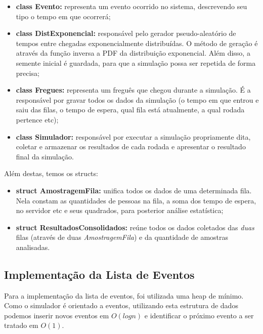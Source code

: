 \documentclass[a4paper,10pt]{article}
\begin{document}
\begin {itemize}
\item \textbf{class Evento:} representa um evento ocorrido no sistema, descrevendo seu tipo o tempo em que ocorrerá;

\item \textbf{class DistExponencial:} responsável pelo gerador pseudo-aleatório de tempos entre chegadas exponencialmente distribuídas. O método de geração é através da função inversa a PDF da distribuição exponencial. Além disso, a semente inicial é guardada, para que a simulação possa ser repetida de forma precisa;

\item \textbf{class Fregues:} representa um freguês que chegou durante a simulação. É a responsável por gravar todos os dados da simulação (o tempo em que entrou e saiu das filas, o tempo de espera, qual fila está atualmente, a qual rodada pertence etc);

\item \textbf{class Simulador:} responsável por executar a simulação propriamente dita, coletar e armazenar os resultados de cada rodada e apresentar o resultado final da simulação.
\end {itemize}

    Além destas, temos os structs:

\begin {itemize}
\item \textbf{struct AmostragemFila:} unifica todos os dados de uma determinada fila. Nela constam as quantidades de pessoas na fila, a soma dos tempo de espera, no servidor etc e seus quadrados, para posterior análise estatística;

\item \textbf{struct ResultadosConsolidados:} reúne todos os dados coletados das \emph{duas} filas (através de duas \emph{AmostragemFila}) e da quantidade de amostras analisadas.
\end {itemize}


\subsection{Implementação da Lista de Eventos}

	Para a implementação da lista de eventos, foi utilizada uma heap de mínimo. Como o simulador é orientado a eventos, utilizando esta estrutura
	de dados podemos inserir novos eventos em $O(log n)$ e identificar o próximo evento a ser tratado em $O(1)$.
\end{document}
